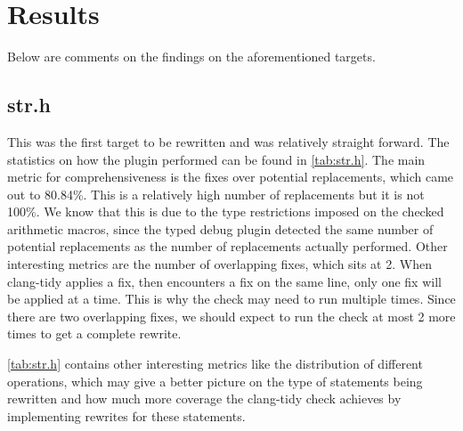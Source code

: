 \section{Results}

Below are comments on the findings on the aforementioned targets.

\subsection{str.h}

This was the first target to be rewritten and was relatively straight forward. The statistics on how the plugin performed can be found in \ref{tab:str.h}. The main metric for comprehensiveness is the fixes over potential replacements, which came out to 80.84\%. This is a relatively high number of replacements but it is not 100\%. We know that this is due to the type restrictions imposed on the checked arithmetic macros, since the typed debug plugin detected the same number of potential replacements as the number of replacements actually performed. Other interesting metrics are the number of overlapping fixes, which sits at 2. When clang-tidy applies a fix, then encounters a fix on the same line, only one fix will be applied at a time. This is why the check may need to run multiple times. Since there are two overlapping fixes, we should expect to run the check at most 2 more times to get a complete rewrite.

\ref{tab:str.h} contains other interesting metrics like the distribution of different operations, which may give a better picture on the type of statements being rewritten and how much more coverage the clang-tidy check achieves by implementing rewrites for these statements.

